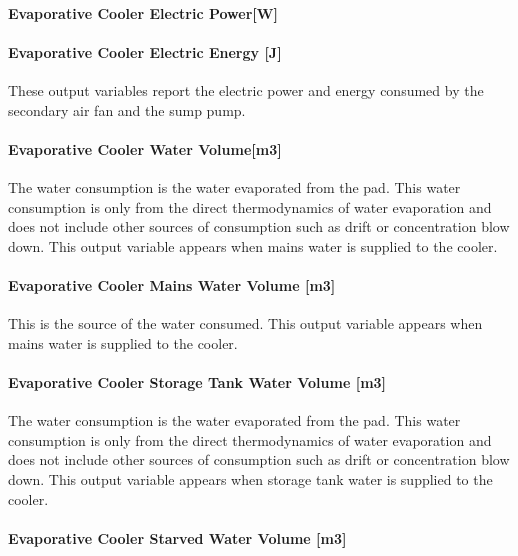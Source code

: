 \paragraph{Evaporative Cooler Electric Power{[}W{]}}\label{evaporative-cooler-electric-powerw-2}

\paragraph{Evaporative Cooler Electric Energy {[}J{]}}\label{evaporative-cooler-electric-energy-j-2}

These output variables report the electric power and energy consumed by the secondary air fan and the sump pump.

\paragraph{Evaporative Cooler Water Volume{[}m3{]}}\label{evaporative-cooler-water-volumem3}

The water consumption is the water evaporated from the pad. This water consumption is only from the direct thermodynamics of water evaporation and does not include other sources of consumption such as drift or concentration blow down. This output variable appears when mains water is supplied to the cooler.

\paragraph{Evaporative Cooler Mains Water Volume {[}m3{]}}\label{evaporative-cooler-mains-water-volume-m3-2}

This is the source of the water consumed. This output variable appears when mains water is supplied to the cooler.

\paragraph{Evaporative Cooler Storage Tank Water Volume {[}m3{]}}\label{evaporative-cooler-storage-tank-water-volume-m3-2}

The water consumption is the water evaporated from the pad. This water consumption is only from the direct thermodynamics of water evaporation and does not include other sources of consumption such as drift or concentration blow down. This output variable appears when storage tank water is supplied to the cooler.

\paragraph{Evaporative Cooler Starved Water Volume {[}m3{]}}\label{evaporative-cooler-starved-water-volume-m3-2}

